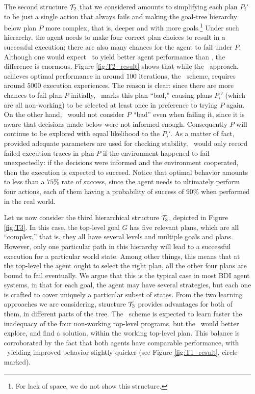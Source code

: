 The second structure ${\mathcal{T}}_2$ that we considered amounts to simplifying
each plan $P_i'$ to be just a single action that always fails and
making the goal-tree hierarchy below plan $P$ more complex, that is,
deeper and with more goals.\footnote{For lack of space, we do not show
this structure.}
%
Under such hierarchy, the agent needs to make four correct plan
choices to result in a successful execution; there are also many
chances for the agent to fail under $P$.
%
Although one would expect \BUL\ to yield better agent performance than
\CL, the difference is enormous. Figure \ref{fig:T2_result} shows
that while the \BUL\ approach, achieves optimal performance in around
$100$ iterations, the \CL\ scheme, requires around $5000$ execution
experiences.  
%
The reason is clear: since there are more chances to fail plan $P$
initially, \CL\ marks this plan ``bad,'' causing plans $P_i'$ (which
are all non-working) to be selected at least once in preference to
trying $P$ again. On the other hand, \BUL\ would not consider $P$
``bad'' even when failing it, since it is aware that decisions made 
below were not informed enough. Consequently $P$ will continue to be
explored with equal likelihood to the $P_i'$.
%
As a matter of fact,
provided adequate parameters are used for checking stability, \BUL\
would only record failed execution traces in plan $P$ if the
environment happened to fail unexpectedly: if the decisions were
informed and the environment cooperated, then the execution is
expected to succeed. 
%
Notice that optimal behavior amounts to less than a $75\%$ rate of
success, since the agent needs to ultimately perform four actions,
each of them having a probability of success of $90\%$ when performed
in the real world. 

Let us now consider the third hierarchical structure ${\mathcal{T}}_3$, depicted
in Figure \ref{fig:T3}. In this case, the top-level goal $G$ has
five relevant plans, which are all ``complex,'' that is, they all have
several levels and multiple goals and plans. However, only one
particular path in this hierarchy will lead to a successful 
execution for a particular world state. 
Among other things, this means that at the top-level the agent ought
to select the right plan, all the other four plans are bound to fail
eventually. 
%
We argue that this is the typical case in most BDI agent systems, in
that for each goal, the agent may have several strategies, but each
one is crafted to cover uniquely a particular subset of states.
%
From the two learning approaches we are considering, structure ${\mathcal{T}}_3$
provides advantages for both of them, in different parts of the
tree. The \CL\ scheme is expected to learn faster the inadequacy 
of the four non-working top-level programs, but the \BUL\ would better
explore, and find a solution, within the working top-level plan.
%
This balance is corroborated by the fact that both agents have
comparable performance, with \BUL\ yielding improved behavior slightly
quicker (see Figure \ref{fig:T1_result}, circle marked). 

